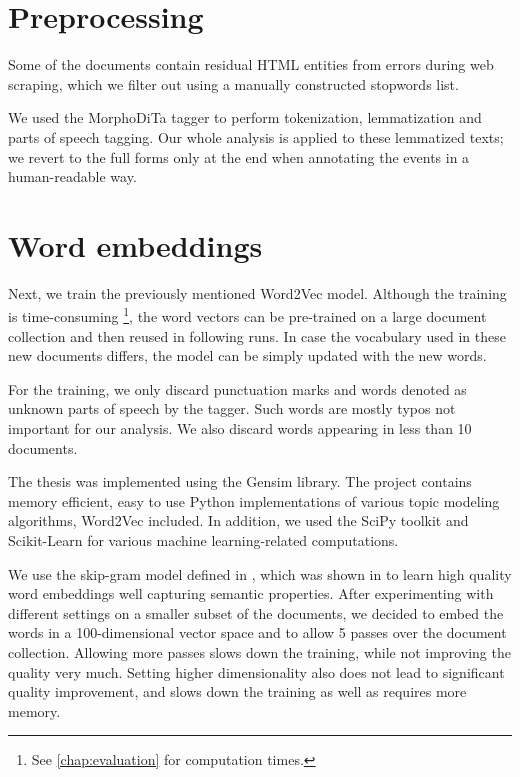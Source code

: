 \section{Preprocessing}
Some of the documents contain residual HTML entities from errors during web scraping, which we filter out using a manually constructed stopwords list.

We used the MorphoDiTa tagger \citep{morphodita} to perform tokenization, lemmatization and parts of speech tagging. Our whole analysis is applied to these lemmatized texts; we revert to the full forms only at the end when annotating the events in a human-readable way.


\section{Word embeddings} \label{word-embeddings}
Next, we train the previously mentioned Word2Vec model. Although the training is time-consuming \footnote{See \autoref{chap:evaluation} for computation times.}, the word vectors can be pre-trained on a large document collection and then reused in following runs. In case the vocabulary used in these new documents differs, the model can be simply updated with the new words.

For the training, we only discard punctuation marks and words denoted as unknown parts of speech by the tagger. Such words are mostly typos not important for our analysis. We also discard words appearing in less than 10 documents.

The thesis was implemented using the Gensim \citep{gensim} library. The project contains memory efficient, easy to use Python implementations of various topic modeling algorithms, Word2Vec included. In addition, we used the SciPy toolkit \citep{scipy} and Scikit-Learn \citep{scikit-learn} for various machine learning-related computations.

We use the skip-gram model defined in \cite{word2vec}, which was shown in \cite{distributed-representations} to learn high quality word embeddings well capturing semantic properties. After experimenting with different settings on a smaller subset of the documents, we decided to embed the words in a 100-dimensional vector space and to allow 5 passes over the document collection. Allowing more passes slows down the training, while not improving the quality very much. Setting higher dimensionality also does not lead to significant quality improvement, and slows down the training as well as requires more memory.

